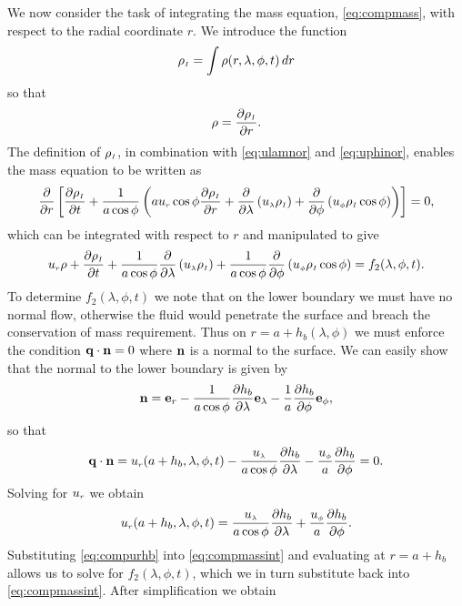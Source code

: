 We now consider the task of integrating the mass equation, \eqref{eq:compmass}, with respect to the radial coordinate $r$. We introduce the function
\begin{equation}
{\ensuremath{\rho_{\scriptscriptstyle I}}}=\int \rho (r,\lambda,\phi,t)\,dr \label{eq:rhoint}
\end{equation}
so that
\begin{equation}
\rho = \frac{\partial {\ensuremath{\rho_{\scriptscriptstyle I}}}}{\partial r}.
\end{equation}
The definition of ${\rho_{\scriptscriptstyle I}}$, in combination with \eqref{eq:ulamnor} and \eqref{eq:uphinor}, enables the mass equation to be written as
\begin{equation}
\frac{\partial}{\partial r} \left[ {\frac{\partial {\ensuremath{\rho_{\scriptscriptstyle I}}}}{\partial t}} + \frac{1}{a\cos\phi}\left(a{u_{\scriptscriptstyle r}}\cos\phi {\ensuremath{\frac{\partial {\ensuremath{\rho_{\scriptscriptstyle I}}}}{\partial r}}} + \frac{\partial}{\partial \lambda}\left({u_{\scriptscriptstyle \lambda}} {\rho_{\scriptscriptstyle I}} \right) + \frac{\partial}{\partial \phi}\left({u_{\scriptscriptstyle \phi}} {\rho_{\scriptscriptstyle I}} \cos\phi\right) \right) \right]=0, \label{eq:compmassmod}
\end{equation}
which can be integrated with respect to $r$ and manipulated to give
\begin{equation}
{\ensuremath{u_{\scriptscriptstyle r}}} \rho + {\frac{\partial {\ensuremath{\rho_{\scriptscriptstyle I}}}}{\partial t}} + \frac{1}{a\cos\phi}\frac{\partial}{\partial \lambda}\left({u_{\scriptscriptstyle \lambda}} {\rho_{\scriptscriptstyle I}} \right)+\frac{1}{a\cos\phi}\frac{\partial}{\partial \phi}\left({u_{\scriptscriptstyle \phi}} {\rho_{\scriptscriptstyle I}} \cos\phi\right)=f_2(\lambda,\phi,t). \label{eq:compmassint}
\end{equation}
To determine $f_2(\lambda,\phi,t)$ we note that on the lower boundary we must have no normal flow, otherwise the fluid would penetrate the surface and breach the conservation of mass requirement. Thus on $r=a+h_b(\lambda,\phi)$ we must enforce the condition $\mathbf{q}\cdot\mathbf{n}=0$ where $\mathbf{n}$ is a normal to the surface. We can easily show that the normal to the lower boundary is given by
\begin{equation}
\mathbf{n}=\mbox{\bfseries e}_{r}-\frac{1}{a\cos\phi}{\frac{\partial h_b}{\partial \lambda}}\mbox{\bfseries e}_{\lambda}-\frac{1}{a}{\frac{\partial h_b}{\partial \phi}}\mbox{\bfseries e}_{\phi},
\end{equation}
so that
\begin{equation}
\mathbf{q}\cdot\mathbf{n}={u_{\scriptscriptstyle r}}(a+h_b,\lambda,\phi,t)-\frac{{u_{\scriptscriptstyle \lambda}}}{a\cos\phi}{\frac{\partial h_b}{\partial \lambda}}-\frac{{u_{\scriptscriptstyle \phi}}}{a}{\frac{\partial h_b}{\partial \phi}}=0.
\end{equation}
Solving for ${u_{\scriptscriptstyle r}}$ we obtain
\begin{equation}
{\ensuremath{u_{\scriptscriptstyle r}}}(a+h_b,\lambda,\phi,t)=\frac{{u_{\scriptscriptstyle \lambda}}}{a\cos\phi}{\frac{\partial h_b}{\partial \lambda}}+\frac{{u_{\scriptscriptstyle \phi}}}{a}{\frac{\partial h_b}{\partial \phi}}. \label{eq:compurhb}
\end{equation}
Substituting \eqref{eq:compurhb} into \eqref{eq:compmassint} and evaluating at $r=a+h_b$ allows us to solve for $f_2(\lambda,\phi,t)$, which we in turn substitute back into \eqref{eq:compmassint}. After simplification we obtain
